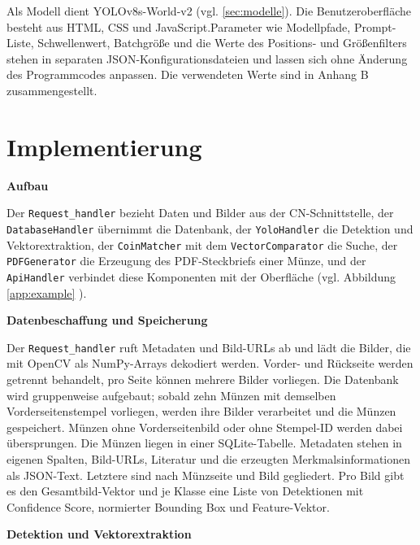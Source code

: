 \noindent Als Modell dient YOLOv8s-World-v2 (vgl. \cref{sec:modelle}). Die Benutzeroberfläche besteht aus HTML, CSS und JavaScript.Parameter wie Modellpfade, Prompt-Liste, Schwellenwert, Batchgröße und die Werte des Positions- und Größenfilters stehen in separaten JSON-Konfigurationsdateien und lassen sich ohne Änderung des Programmcodes anpassen. Die verwendeten Werte sind in Anhang B zusammengestellt.

\section{Implementierung}
\label{sec:implementierung}
\textbf{Aufbau}

\noindent Der \lstinline|Request_handler| bezieht Daten und Bilder aus der CN-Schnittstelle, der \lstinline|DatabaseHandler| übernimmt die Datenbank, der \lstinline|YoloHandler| die Detektion und Vektorextraktion, der \lstinline|CoinMatcher| mit dem \lstinline|VectorComparator| die Suche, der \lstinline|PDFGenerator| die Erzeugung des PDF-Steckbriefs einer Münze, und der \lstinline|ApiHandler| verbindet diese Komponenten mit der Oberfläche (vgl. Abbildung \cref{app:example} ).

\vspace{\baselineskip}

\noindent \textbf{Datenbeschaffung und Speicherung}

\noindent Der \lstinline|Request_handler| ruft Metadaten und Bild-URLs ab und lädt die Bilder, die mit OpenCV als NumPy-Arrays dekodiert werden. Vorder- und Rückseite werden getrennt behandelt, pro Seite können mehrere Bilder vorliegen. Die Datenbank wird gruppenweise aufgebaut; sobald zehn Münzen mit demselben Vorderseitenstempel vorliegen, werden ihre Bilder verarbeitet und die Münzen gespeichert. Münzen ohne Vorderseitenbild oder ohne Stempel-ID werden dabei übersprungen. Die Münzen liegen in einer SQLite-Tabelle. Metadaten stehen in eigenen Spalten, Bild-URLs, Literatur und die erzeugten Merkmalsinformationen als JSON-Text. Letztere sind nach Münzseite und Bild gegliedert. Pro Bild gibt es den Gesamtbild-Vektor und je Klasse eine Liste von Detektionen mit Confidence Score, normierter Bounding Box und Feature-Vektor.

\vspace{\baselineskip}

\noindent \textbf{Detektion und Vektorextraktion}

